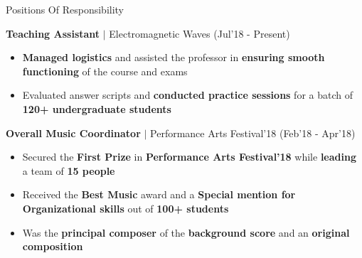 \documentclass{resume}
\newcommand{\sepval}{-0.5em}
\begin{document}

\begin{rSection}{Positions Of Responsibility}

\vspace{-0.4cm}

	\item {\bf{Teaching Assistant}} $\mid$ Electromagnetic Waves \hfill{(Jul'18 - Present)}
		
		\begin{itemize}[leftmargin=*]
			
			\itemsep \sepval
		
			\item {\bf Managed logistics} and assisted the professor in {\bf ensuring smooth functioning} of the course and exams

			\item Evaluated answer scripts and {\bf conducted practice sessions} for a batch of {\bf 120+ undergraduate students}
			
		\end{itemize}

	\item {\bf{Overall Music Coordinator}} $\mid$ Performance Arts Festival'18 \hfill{(Feb'18 - Apr'18)}

		\begin{itemize}[leftmargin=*]
	
			\itemsep \sepval
		
			\item Secured the {\bf First Prize} in {\bf Performance Arts Festival'18} while {\bf leading} a team of {\bf 15 people}

			\item Received the {\bf{Best Music}} award and a {\bf Special mention for Organizational skills} out of {\bf 100+ students}
			
			\item Was the {\bf{principal composer}} of the {\bf{background score}} and an {\bf{original composition}}
			
	
		\end{itemize}

\end{rSection}
\end{document}
